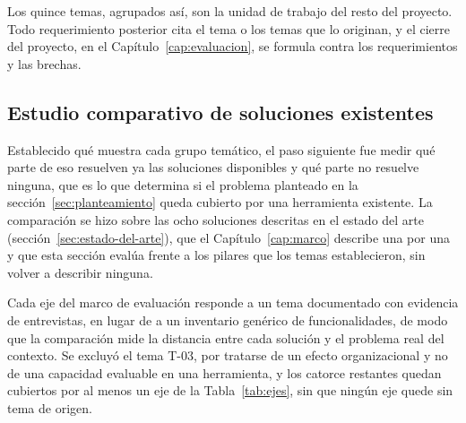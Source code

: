 Los quince temas, agrupados así, son la unidad de trabajo del resto del
proyecto. Todo requerimiento posterior cita el tema o los temas que lo
originan, y el cierre del proyecto, en el Capítulo~\ref{cap:evaluacion}, se
formula contra los requerimientos y las brechas.

\subsection{Estudio comparativo de soluciones existentes}
\label{sec:estudio-comparativo}

Establecido qué muestra cada grupo temático, el paso siguiente fue medir qué
parte de eso resuelven ya las soluciones disponibles y qué parte no resuelve
ninguna, que es lo que determina si el problema planteado en la
sección~\ref{sec:planteamiento} queda cubierto por una herramienta existente.
La comparación se hizo sobre las ocho soluciones descritas en el estado del
arte (sección~\ref{sec:estado-del-arte}), que el Capítulo~\ref{cap:marco}
describe una por una y que esta sección evalúa frente a los pilares que los
temas establecieron, sin volver a describir ninguna.

Cada eje del marco de evaluación responde a un tema documentado con evidencia
de entrevistas, en lugar de a un inventario genérico de funcionalidades, de
modo que la comparación mide la distancia entre cada solución y el problema
real del contexto. Se excluyó el tema T-03, por tratarse de un efecto
organizacional y no de una capacidad evaluable en una herramienta, y los
catorce restantes quedan cubiertos por al menos un eje de la
Tabla~\ref{tab:ejes}, sin que ningún eje quede sin tema de origen.

